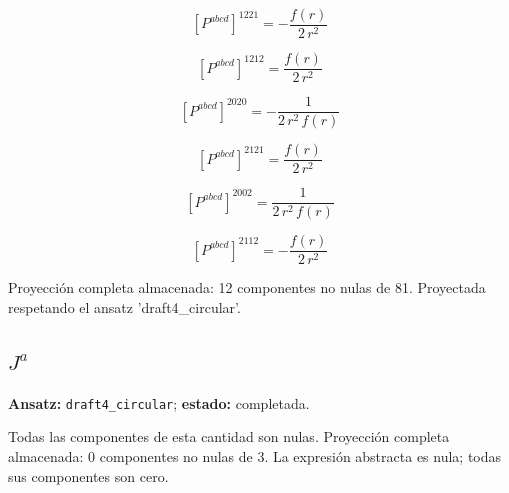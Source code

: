 \documentclass[11pt]{article}
\begin{document}
\begin{dmath*}[breakdepth={5}]
\left[P^{abcd}\right]^{1221} = -\frac{f\!\left(r\right)}{2\,{r}^{2}}
\end{dmath*}
\par\smallskip
\begin{dmath*}[breakdepth={5}]
\left[P^{abcd}\right]^{1212} = \frac{f\!\left(r\right)}{2\,{r}^{2}}
\end{dmath*}
\par\smallskip
\begin{dmath*}[breakdepth={5}]
\left[P^{abcd}\right]^{2020} = -\frac{1}{2\,{r}^{2}\,f\!\left(r\right)}
\end{dmath*}
\par\smallskip
\begin{dmath*}[breakdepth={5}]
\left[P^{abcd}\right]^{2121} = \frac{f\!\left(r\right)}{2\,{r}^{2}}
\end{dmath*}
\par\smallskip
\begin{dmath*}[breakdepth={5}]
\left[P^{abcd}\right]^{2002} = \frac{1}{2\,{r}^{2}\,f\!\left(r\right)}
\end{dmath*}
\par\smallskip
\begin{dmath*}[breakdepth={5}]
\left[P^{abcd}\right]^{2112} = -\frac{f\!\left(r\right)}{2\,{r}^{2}}
\end{dmath*}
\par\smallskip
Proyección completa almacenada: 12 componentes no nulas de 81. Proyectada respetando el ansatz 'draft4\_circular'.\par\medskip
{}
\subsection*{$ J^a $}
\textbf{Ansatz:} \texttt{draft4\_circular}; \textbf{estado:} completada.\par
Todas las componentes de esta cantidad son nulas.
Proyección completa almacenada: 0 componentes no nulas de 3. La expresión abstracta es nula; todas sus componentes son cero.\par\medskip
{}
\end{document}
